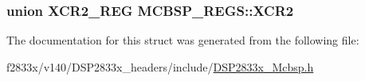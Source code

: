 \subsubsection[{X\+C\+R2}]{\setlength{\rightskip}{0pt plus 5cm}union {\bf X\+C\+R2\+\_\+\+R\+E\+G} M\+C\+B\+S\+P\+\_\+\+R\+E\+G\+S\+::\+X\+C\+R2}\label{struct_m_c_b_s_p___r_e_g_s_a26e6ced244b0f00720e7a6de73446fad}


The documentation for this struct was generated from the following file\+:\begin{DoxyCompactItemize}
\item 
f2833x/v140/\+D\+S\+P2833x\+\_\+headers/include/\hyperlink{_d_s_p2833x___mcbsp_8h}{D\+S\+P2833x\+\_\+\+Mcbsp.\+h}\end{DoxyCompactItemize}
